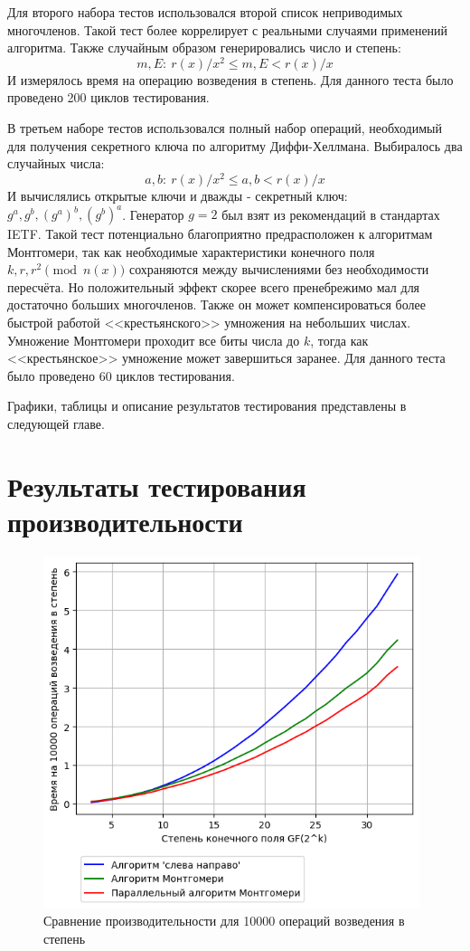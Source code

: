 \documentclass[times,specification,annotation]{itmo-student-thesis}
\begin{document}
Для второго набора тестов использовался второй список неприводимых многочленов.
Такой тест более коррелирует с реальными случаями применений алгоритма.
Также случайным образом генерировались число и степень:
\[m, E:~r(x)/x^2 \leq m, E < r(x)/x\]
И измерялось время на операцию возведения в степень.
Для данного теста было проведено 200 циклов тестирования.

В третьем наборе тестов использовался полный набор операций, необходимый для получения секретного ключа по алгоритму Диффи-Хеллмана.
Выбиралось два случайных числа:
\[a, b:~r(x)/x^2 \leq a,b < r(x)/x\]
И вычислялись открытые ключи и дважды - секретный ключ: $g^a, g^b, (g^a)^b, (g^b)^a$.
Генератор $g = 2$ был взят из рекомендаций в стандартах IETF.
Такой тест потенциально благоприятно предрасположен к алгоритмам Монтгомери, так как необходимые характеристики конечного поля
$k, r, r^2 \pmod{n(x)}$ сохраняются между вычислениями без необходимости пересчёта.
Но положительный эффект скорее всего пренебрежимо мал для достаточно больших многочленов.
Также он может компенсироваться более быстрой работой <<крестьянского>> умножения на небольших числах.
Умножение Монтгомери проходит все биты числа до $k$, тогда как <<крестьянское>> умножение может завершиться заранее.
Для данного теста было проведено 60 циклов тестирования.

Графики, таблицы и описание результатов тестирования представлены в следующей главе.

\section{Результаты тестирования производительности}\label{sec:results}

\begin{figure}[h]
\caption{Сравнение производительности для 10000 операций возведения в степень}\label{fig:res}
\includegraphics[width=11cm]{graphics/results_ru.png}
\end{figure}
\end{document}
